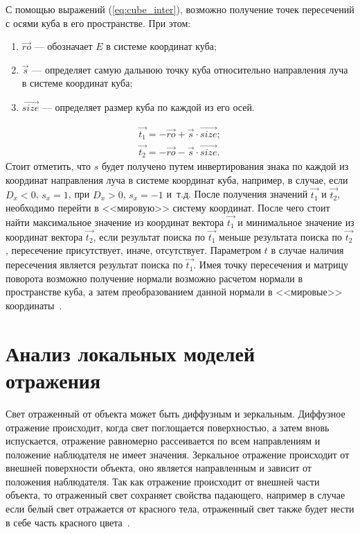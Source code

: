 С помощью выражений (\ref{eq:cube_inter}), возможно получение 
точек пересечений с осями куба в его пространстве.
При этом:
\begin{enumerate}
	\item $\vec{ro}$ --- обозначает $E$ в системе координат куба;
	\item $\vec{s}$ --- определяет самую дальнюю точку куба относительно направления луча в системе координат куба;
	\item $\vec{size}$ --- определяет размер куба по каждой из его осей.
\end{enumerate}

\begin{equation}
	\begin{aligned}
		\vec{t_{1}} = -\vec{ro} + \vec{s} \cdot \vec{size};\\
		\vec{t_{2}} = -\vec{ro} - \vec{s} \cdot \vec{size}.
	\end{aligned}
	\label{eq:cube_inter}
\end{equation}
Стоит отметить, что $s$ будет получено  путем инвертирования знака по каждой из координат направления луча  в системе координат куба, например, в случае, если $D_{x} < 0$, $s_{x} = 1$, при $D_{x} > 0$, $s_{x} = -1$ и~т.д. После получения значений $\vec{t_{1}}$ и $\vec{t_{2}}$, необходимо перейти в <<мировую>> систему координат.
После чего стоит найти максимальное значение из координат вектора $\vec{t_{1}}$ и минимальное значение из координат вектора $\vec{t_{2}}$, если результат поиска по $\vec{t_{1}}$ меньше результата поиска по $\vec{t_{2}}$, пересечение присутствует, иначе, отсутствует. Параметром $t$ в случае наличия пересечения является результат поиска по $\vec{t_{1}}$. Имея точку пересечения  и матрицу поворота возможно получение нормали возможно расчетом нормали в пространстве куба, а затем преобразованием данной нормали в <<мировые>> координаты~\cite{cubeInter}.



\section{Анализ локальных моделей отражения}
\label{sec:reflection_models}
Свет отраженный от объекта может быть диффузным и зеркальным.
Диффузное отражение происходит, когда свет поглощается поверхностью, а затем вновь испускается, 
отражение равномерно рассеивается по всем направлениям и положение наблюдателя не имеет значения. Зеркальное отражение
происходит от внешней поверхности объекта, оно является направленным и зависит от положения наблюдателя.
Так как отражение происходит от внешней части объекта, то отраженный свет сохраняет свойства падающего, например в случае если белый свет отражается
от красного тела, отраженный свет также будет нести в себе часть красного цвета~\cite{Rodgers}.

